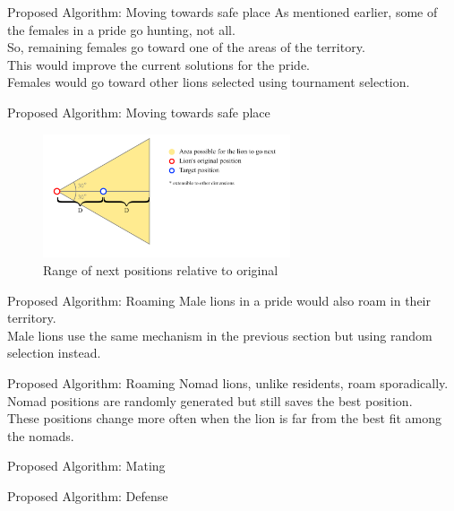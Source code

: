 \documentclass[xcolor=table]{beamer}
\begin{document}
\begin{frame}{Proposed Algorithm: Moving towards safe place}
As mentioned earlier, some of the females in a pride go hunting, not all.\\So, remaining females go toward one of the areas of the territory.\\This would improve the current solutions for the pride.\\Females would go toward other lions selected using tournament selection.
\end{frame}

\begin{frame}{Proposed Algorithm: Moving towards safe place}
  \begin{figure}[h]
  \begin{center}
  \includegraphics[width=0.65\textwidth]{img/moving/moving}
  \caption{Range of next positions relative to original}
  \end{center}
  \end{figure}
\end{frame}

\begin{frame}{Proposed Algorithm: Roaming}
Male lions in a pride would also roam in their territory.\\Male lions use the same mechanism in the previous section but using random selection instead.
\end{frame}

\begin{frame}{Proposed Algorithm: Roaming}
Nomad lions, unlike residents, roam sporadically.\\Nomad positions are randomly generated but still saves the best position.\\These positions change more often when the lion is far from the best fit among the nomads.
\end{frame}

\begin{frame}{Proposed Algorithm: Mating}
\end{frame}

\begin{frame}{Proposed Algorithm: Defense}
\end{frame}
\end{document}

